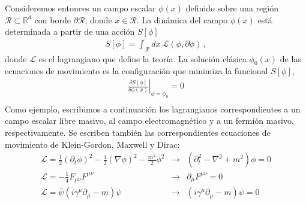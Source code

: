 Consideremos entonces un campo escalar $\phi(x)$ definido sobre una región $\mathcal R\subset \mathbb{R}^d$ con borde $\partial \mathcal R$, donde $x \in  \mathcal R$. La dinámica del campo $\phi(x)$ está determinada a partir de una acción $S[\phi]$
{\red \begin{align}
		S[\phi]=\int_\mathcal R dx\ \mathscr L(\phi,\partial\phi)\,,
\end{align}}
donde $\mathscr L$ es el lagrangiano que define la teoría. La solución clásica $\phi _0(x)$ de las ecuaciones de movimiento es la configuración que minimiza la funcional $S[\phi]$,
\begin{equation}
\begin{array}{c}
\left. \frac{\delta S [ \phi ] }{\delta \phi (x)}  \right| _{\phi = \phi _0  } = 0 \\[10pt]
\end{array}
\end{equation}
{\red Como ejemplo, escribimos a continuación los lagrangianos correspondientes a un campo escalar libre masivo, al campo electromagnético y a un fermión masivo, respectivamente. Se escriben también las correspondientes ecuaciones de movimiento de Klein-Gordon, Maxwell y Dirac:}
\begin{equation}
\begin{array}{lcl}
\mathscr{L} = \frac{1}{2} (\partial _t \phi ) ^2 - \frac{1}{2} (  \nabla \phi ) ^2 - 
	\frac{m^2}{2} \phi ^2 
&\rightarrow& 
\left(
	\partial _t ^2 - \nabla ^2 + m^2 
		\right) \phi = 0 \\[8pt]
		
\mathscr{L} = - \frac{1}{4} F _{\mu \nu} F ^{\mu \nu}
&\rightarrow&
 \partial _{\mu} F ^{\mu \nu} = 0 \\[8pt]

\mathscr{L} =  { \bar{\psi} } \left(
			i \gamma ^{\mu} \partial _{\mu} - m 
			\right) \psi 
&\rightarrow&
			\left( i  \gamma ^{\mu} \partial _{\mu}  - m \right)\psi = 0\\[10pt]
\end{array}
\label{campos}
\end{equation}

